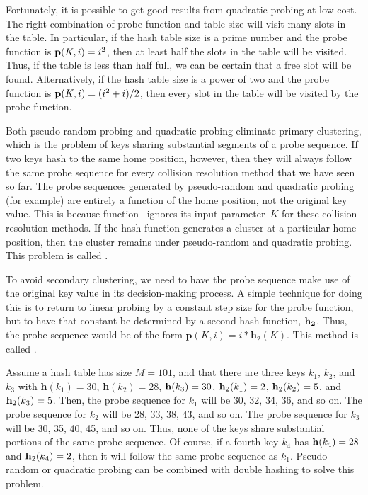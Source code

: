 Fortunately, it is possible to get good results from quadratic probing
at low cost.
The right combination of probe function and table size will visit many
slots in the table.
In particular, if the hash table size is a prime number and the probe
function is \({\bf p}(K, i) = i^2\), then at least half the slots in
the table will be visited.
Thus, if the table is less than half full, we can be certain that a
free slot will be found.
Alternatively, if the hash table size is a power of two and the probe
function is \({\bf p}(K, i) = (i^2 + i)/2\), then every slot in the
table will be visited by the probe function.

Both pseudo-random probing
and quadratic probing eliminate
primary clustering, which is the problem of keys sharing substantial
segments of a probe sequence.
If two keys hash to the same home position, however, then they will always
follow the same probe sequence for every collision resolution method that
we have seen so far.
The probe sequences generated by
pseudo-random and
quadratic probing
(for example) are entirely a function of the home
position, not the original key value.
This is because function~ ignores its input parameter~\(K\)
for these collision resolution methods.
If the hash function generates a cluster at a particular home
position, then the cluster remains under pseudo-random and quadratic
probing.
This problem is called .

To avoid secondary clustering, we need to have the probe sequence make
use of the original key value in its decision-making process.
A simple technique for doing this is to return to
linear probing by a constant step size
for the probe function, but to
have that constant be determined by a second hash function,
\(\bf{h}_2\).
Thus, the probe sequence would be of the form
\({\mathbf p}(K, i) = i * {\mathbf h}_2(K)\).
This method is called .

\vspace{-\smallskipamount}
\begin{example}
Assume a hash table has size \(M = 101\), and that there are three
keys \(k_1\), \(k_2\), and \(k_3\) with {\bf h}\((k_1) = 30\),
{\bf h}\((k_2) = 28\), \({\bf h}(k_3) = 30\),
\({\bf h}_2(k_1) = 2\), \({\bf h}_2(k_2) = 5\), and
\({\bf h}_2(k_3) = 5\).
Then, the probe sequence for \(k_1\) will be 30, 32, 34, 36, and so on.
The probe sequence for \(k_2\) will be 28, 33, 38, 43, and so on.
The probe sequence for \(k_3\) will be 30, 35, 40, 45, and so on.
Thus, none of the keys share substantial portions of the same probe
sequence.
Of course, if a fourth key \(k_4\) has \({\bf h}(k_4) = 28\) and
\({\bf h}_2(k_4) = 2\), then it will follow the same probe sequence as
\(k_1\).
Pseudo-random
or quadratic probing can be combined
with double hashing to solve this problem.
\end{example}

